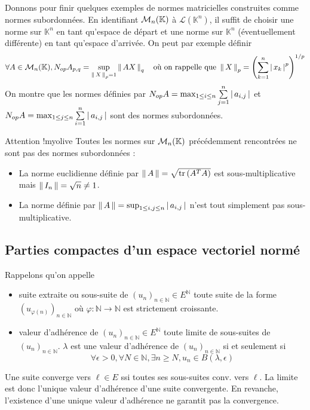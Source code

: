     Donnons pour finir quelques exemples de normes matricielles construites comme normes subordonnées. En identifiant $\mathcal{M}_{n}(\mathbb{K})$ à $\mathcal{L}(\mathbb{K}^n)$, il suffit de choisir une norme sur $\mathbb{K}^n$ en tant qu’espace de départ et une norme sur $\mathbb{K}^n$ (éventuellement différente) en tant qu’espace d’arrivée. On peut par exemple définir 
    \[ \forall A \in \mathcal{M}_{n}(\mathbb{K}), N_{op}{A}_{p,q} = \sup_{\left\lVert \,X \, \right\rVert_p= 1} \left\lVert \,AX \, \right\rVert_q \quad \text{où on rappelle que } \left\lVert \,X \, \right\rVert_p = \left(\sum\limits_{k=1}^n \left\lvert \,x_k \, \right\rvert^p\right)^{1/p} \]
    On montre que les normes définies par $N_{op}{A} = \max_{1 \leq i \leq n} \sum\limits_{j=1}^n \left\lvert \,a_{i,j} \, \right\rvert$ et $N_{op}{A} = \max_{1 \leq j \leq n} \sum\limits_{i =1}^n \left\lvert \,a_{i,j} \, \right\rvert$ sont des normes subordonnées.

    \begin{omed}{Attention !}{myolive}
        Toutes les normes sur $\mathcal{M}_{n}(\mathbb{K})$ précédemment rencontrées ne sont pas des normes subordonnées : 
        \begin{itemize}
            \item La norme euclidienne définie par $\left\lVert \,A \, \right\rVert = \sqrt{\operatorname{tr}\left(A^T A\right)}$ est sous-multiplicative mais $\left\lVert \,I_n \, \right\rVert = \sqrt{n} \neq 1$.
            \item La norme définie par $\left\lVert \,A \, \right\rVert = \sup_{1 \leq i,j \leq n} \left\lvert \,a_{i,j} \, \right\rvert$ n’est tout simplement pas sous-multiplicative.
        \end{itemize}
    \end{omed}

\subsection{Parties compactes d’un espace vectoriel normé}

    Rappelons qu’on appelle 
    \begin{itemize}
        \item suite extraite ou sous-suite de $(u_n)_{n \in \mathbb{N}} \in E^{\mathbb{N}}$ toute suite de la forme $(u_{\varphi(n)})_{n \in \mathbb{N}}$ où $\varphi : \mathbb{N} \rightarrow \mathbb{N}$ est strictement croissante.
        \item valeur d’adhérence de $(u_n)_{n \in \mathbb{N}} \in E^{\mathbb{N}}$ toute limite de sous-suites de $(u_n)_{n \in \mathbb{N}}$. $\lambda$ est une valeur d’adhérence de $(u_n)_{n \in \mathbb{N}}$ si et seulement si 
        \[ \forall \epsilon > 0, \forall N \in \mathbb{N}, \exists n \geq N, u_n \in B(\lambda,\epsilon) \]
    \end{itemize}
    Une suite converge vers $\ell \in E$ ssi toutes ses sous-suites conv. vers $\ell$. La limite est donc l’unique valeur d’adhérence d’une suite convergente. En revanche, l’existence d’une unique valeur d’adhérence ne garantit pas la convergence.

